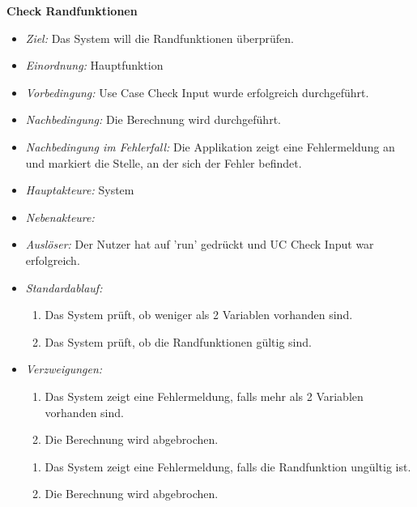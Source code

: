 \textbf{Check Randfunktionen}
  \begin{itemize}
  \item \textit{Ziel:} Das System will die Randfunktionen \"uberpr\"ufen.
  \item \textit{Einordnung:} Hauptfunktion
  \item \textit{Vorbedingung:} Use Case Check Input wurde erfolgreich durchgef\"uhrt.
  \item \textit{Nachbedingung:} Die Berechnung wird durchgef\"uhrt.
  \item \textit{Nachbedingung im Fehlerfall:} Die Applikation zeigt eine Fehlermeldung an und markiert die Stelle, an der sich der Fehler befindet.
  \item \textit{Hauptakteure:} System
  \item \textit{Nebenakteure:}
  \item \textit{Ausl\"oser:} Der Nutzer hat auf 'run' gedr\"uckt und UC Check Input war erfolgreich.
  \item \textit{Standardablauf:}
    \begin{enumerate}
    \item Das System pr\"uft, ob weniger als 2 Variablen vorhanden sind.
    \item Das System pr\"uft, ob die Randfunktionen g\"ultig sind.
  \end{enumerate}
  \item \textit{Verzweigungen:}
    \begin{enumerate}[label=(1a\arabic*)]
	\item Das System zeigt eine Fehlermeldung, falls mehr als 2 Variablen vorhanden sind.
	\item Die Berechnung wird abgebrochen.
	\end{enumerate}
	 \begin{enumerate}[label=(2a\arabic*)]
	\item Das System zeigt eine Fehlermeldung, falls die Randfunktion ung\"ultig ist.
	\item Die Berechnung wird abgebrochen.
    \end{enumerate}
  \end{itemize}